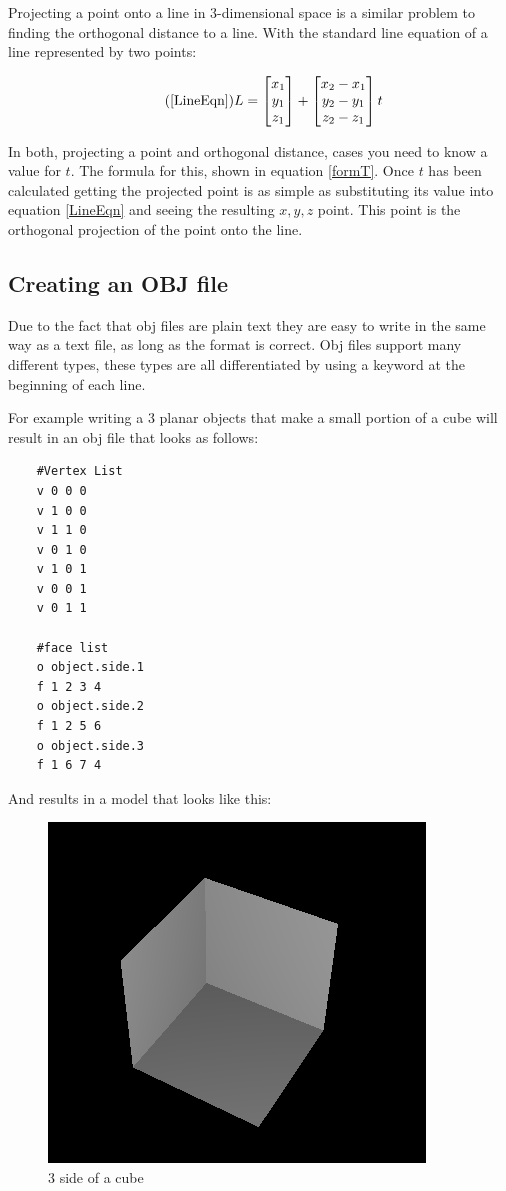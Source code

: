 	Projecting a point onto a line in 3-dimensional space is a similar problem to finding the orthogonal distance to a line. With the standard line equation of a line represented by two points:
	
	\begin{equation}\tag{\ref{LineEqn}}
		L = \begin{bmatrix}
		x_1 \\
		y_1\\
		z_1 
		\end{bmatrix} + \begin{bmatrix}
		x_2 - x_1 \\
		y_2 - y_1\\
		z_2 - z_1
		\end{bmatrix}t
	\end{equation}
	
	In both, projecting a point and orthogonal distance, cases you need to know a value for $t$. The formula for this, shown in equation \ref{formT}. Once $t$ has been calculated getting the projected point is as simple as substituting its value into equation \ref{LineEqn} and seeing the resulting $x,y,z$ point. This point is the orthogonal projection of the point onto the line.
	
	\subsection{Creating an OBJ file}
	
	Due to the fact that obj files are plain text they are easy to write in the same way as a text file, as long as the format is correct. Obj files support many different types, these types are all differentiated by using a keyword at the beginning of each line. 
	
	For example writing a 3 planar objects that make a small portion of a cube will result in an obj file that looks as follows:
	\begin{lstlisting}
	#Vertex List
	v 0 0 0
	v 1 0 0
	v 1 1 0
	v 0 1 0
	v 1 0 1
	v 0 0 1
	v 0 1 1

	#face list
	o object.side.1
	f 1 2 3 4
	o object.side.2
	f 1 2 5 6
	o object.side.3
	f 1 6 7 4
	\end{lstlisting}
	And results in a model that looks like this:
	
	
	\begin{figure}[H]
		\centering
		\includegraphics[width=0.5\linewidth]{Includes/images/half-box}
		\caption{3 side of a cube}
		\label{fig:half-box}
	\end{figure}
	
